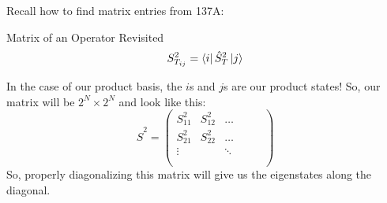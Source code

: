             Recall how to find matrix entries from 137A:
            \begin{theorem}{Matrix of an Operator Revisited}{}
                $$S_{T_{ij}}^2 = \bra{i}\hat{S}_{T}^2\ket{j}$$
            \end{theorem}
            In the case of our product basis, the $i$s and $j$s are our product states! So, our matrix will be $2^N\times2^N$ and look like this:
            $$\hat{S}^2 = \begin{pmatrix}S_{11}^2 & S_{12}^2 &\dots & & \\ S_{21}^2 & S_{22}^2 & \dots & & \\ \vdots & & \ddots & & \\ & & & & & \\ & & & & &\end{pmatrix}$$
            So, properly diagonalizing this matrix will give us the eigenstates along the diagonal.
